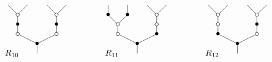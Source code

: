 \documentclass[../main.tex]{subfiles}
\begin{document}
\begin{ex}
    $$
        \xy
        <0.08cm, 0cm>:
        (0.0, 0.0)*{}="1"; %
        (0.0, 5.0)*=0{\bullet}="2"; %
        (-10.0, 10.0)*\cir<2pt>{}="3"; %
        (-10.0, 15.0)*=0{\bullet}="4"; %
        (-10.0, 20.0)*\cir<2pt>{}="5"; %
        (-15.0, 25.0)*{}="6"; %
        (-5.0, 25.0)*{}="7"; %
        (10.0, 10.0)*\cir<2pt>{}="8"; %
        (10.0, 15.0)*=0{\bullet}="9"; %
        (10.0, 20.0)*\cir<2pt>{}="10"; %
        (5.0, 25.0)*{}="11"; %
        (15.0, 25.0)*{}="12"; %
        "1";"2" **\dir{-};
        "2";"3" **\dir{-};
        "3";"4" **\dir{-};
        "4";"5" **\dir{-};
        "5";"6" **\dir{-};
        "5";"7" **\dir{-};
        "2";"8" **\dir{-};
        "8";"9" **\dir{-};
        "9";"10" **\dir{-};
        "10";"11" **\dir{-};
        "10";"12" **\dir{-};
        (-13,0)*{R_{10}};
        \endxy
        \xy
        <0.08cm, 0cm>:
        (-10, 0.0)*{}="1";
        (10, 10.0)*{}="2";
        \endxy
        \xy
        <0.08cm, 0cm>:
        (0.0, 0.0)*{}="1"; %
        (0.0, 5.0)*=0{\bullet}="2"; %
        (-10.0, 10.0)*\cir<2pt>{}="3"; %
        (-10.0, 15.0)*\cir<2pt>{}="4"; %
        (-15.0, 20.0)*=0{\bullet}="5"; %
        (-15.0, 25.0)*{}="6"; %
        (-5.0, 20.0)*=0{\bullet}="7"; %
        (-5.0, 25.0)*{}="8"; %
        (10.0, 10.0)*=0{\bullet}="9"; %
        (10.0, 15.0)*\cir<2pt>{}="10"; %
        (10.0, 20.0)*\cir<2pt>{}="11"; %
        (5.0, 25.0)*{}="12"; %
        (15.0, 25.0)*{}="13"; %
        "1";"2" **\dir{-};
        "2";"3" **\dir{-};
        "3";"4" **\dir{-};
        "4";"5" **\dir{-};
        "5";"6" **\dir{-};
        "4";"7" **\dir{-};
        "7";"8" **\dir{-};
        "2";"9" **\dir{-};
        "9";"10" **\dir{-};
        "10";"11" **\dir{-};
        "11";"12" **\dir{-};
        "11";"13" **\dir{-};
        (-13,0)*{R_{11}};
        \endxy
        \xy
        <0.08cm, 0cm>:
        (-10, 0.0)*{}="1";
        (10, 10.0)*{}="2";
        \endxy
        \xy
        <0.08cm, 0cm>:
        (0.0, 0.0)*{}="1"; %
        (0.0, 5.0)*=0{\bullet}="2"; %
        (-10.0, 10.0)*=0{\bullet}="3"; %
        (-10.0, 15.0)*\cir<2pt>{}="4"; %
        (-10.0, 20.0)*\cir<2pt>{}="5"; %
        (-15.0, 25.0)*{}="6"; %
        (-5.0, 25.0)*{}="7"; %
        (10.0, 10.0)*\cir<2pt>{}="8"; %
        (10.0, 15.0)*=0{\bullet}="9"; %
        (10.0, 20.0)*\cir<2pt>{}="10"; %
        (5.0, 25.0)*{}="11"; %
        (15.0, 25.0)*{}="12"; %
        "1";"2" **\dir{-};
        "2";"3" **\dir{-};
        "3";"4" **\dir{-};
        "4";"5" **\dir{-};
        "5";"6" **\dir{-};
        "5";"7" **\dir{-};
        "2";"8" **\dir{-};
        "8";"9" **\dir{-};
        "9";"10" **\dir{-};
        "10";"11" **\dir{-};
        "10";"12" **\dir{-};
        (-13,0)*{R_{12}};
        \endxy
    $$


\end{ex}
\end{document}
